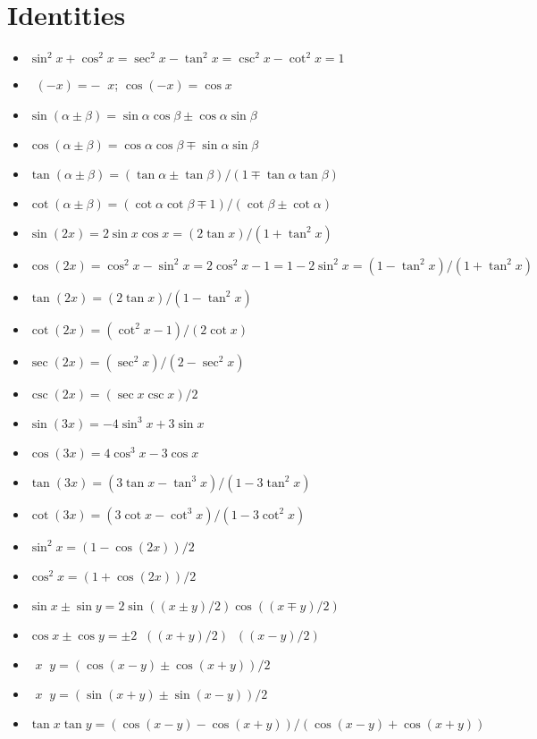 \documentclass{slnotes}
\begin{document}
\chapter{Identities}
\begin{itemize}
\item \(\sin^2 x+\cos^2 x = \sec^2 x - \tan^2 x = \csc^2 x - \cot^2 x = 1\)
\item \(\mathop{{}^{\sin}_{\tan}{}}(-x) = -\mathop{{}^{\sin}_{\tan}} x\); \(\cos(-x) = \cos x\)
\item \(\sin(\alpha\pm\beta) = \sin\alpha\cos\beta\pm\cos\alpha\sin\beta\)
\item \(\cos(\alpha\pm\beta) = \cos\alpha\cos\beta\mp\sin\alpha\sin\beta\)
\item \(\tan(\alpha\pm\beta) = (\tan\alpha\pm\tan\beta)/(1\mp\tan\alpha\tan\beta)\)
\item \(\cot(\alpha\pm\beta) = (\cot\alpha\cot\beta\mp 1)/(\cot\beta\pm\cot\alpha)\)
\item \(\sin(2x) = 2\sin x\cos x = (2\tan x)/(1+\tan^2 x)\)
\item \(\cos(2x) = \cos^2 x-\sin^2 x = 2\cos^2 x - 1 = 1 - 2\sin^2 x = (1-\tan^2 x)/(1+\tan^2 x)\)
\item \(\tan(2x) = (2\tan x)/(1-\tan^2 x)\)
\item \(\cot(2x) = (\cot^2 x - 1)/(2\cot x)\)
\item \(\sec(2x) = (\sec^2 x)/(2 - \sec^2 x)\)
\item \(\csc(2x) = (\sec x\csc x)/2\)
\item \(\sin(3x) = -4\sin^3x+3\sin x\)
\item \(\cos(3x) = 4\cos^3x-3\cos x\)
\item \(\tan(3x) = (3\tan x-\tan^3x)/(1-3\tan^2x)\)
\item \(\cot(3x) = (3\cot x-\cot^3x)/(1-3\cot^2x)\)
\item \(\sin^2x = (1-\cos(2x))/2\)
\item \(\cos^2x = (1+\cos(2x))/2\)
\item \(\sin x\pm\sin y = 2\sin((x\pm y)/2)\cos((x\mp y)/2)\)
\item \(\cos x\pm\cos y = \pm2\mathop{{}^{\cos}_{\sin}{}}((x+y)/2)\mathop{{}^{\cos}_{\sin}{}}((x-y)/2)\)
\item \(\mathop{{}^{\cos}_{\sin}{}}x\mathop{{}^{\cos}_{\sin}{}}y = (\cos(x-y)\pm\cos(x+y))/2\)
\item \(\mathop{{}^{\sin}_{\cos}{}}x\mathop{{}^{\cos}_{\sin}{}}y = (\sin(x+y)\pm\sin(x-y))/2\)
\item \(\tan x\tan y = (\cos(x-y)-\cos(x+y))/(\cos(x-y)+\cos(x+y))\)
\end{itemize}
\end{document}
